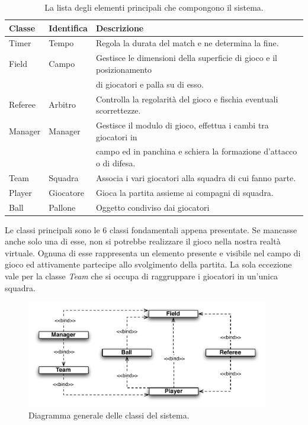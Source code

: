 \documentclass[aps,letterpaper,10pt]{article}
\begin{document}
\begin{table}[H]
\begin{center}
	\begin{tabular}{|l|l|l|}
		\hline
		\textbf{Classe} & \textbf{Identifica} & \textbf{Descrizione} \\ \hline \hline
		Timer & Tempo & Regola la durata del match e ne determina la fine. \\ \hline
		Field & Campo & Gestisce le dimensioni della superficie di gioco e il posizionamento \\
		& & di giocatori e palla su di esso. \\ \hline
		Referee & Arbitro & Controlla la regolarit\`a del gioco e fischia eventuali scorrettezze. \\ \hline
		Manager & Manager & Gestisce il modulo di gioco, effettua i cambi tra giocatori in \\
		& & campo ed in panchina e schiera la formazione d'attacco o di difesa. \\ \hline
		Team & Squadra & Associa i vari giocatori alla squadra di cui fanno parte. \\ \hline
		Player & Giocatore & Gioca la partita assieme ai compagni di squadra. \\ \hline
		Ball & Pallone & Oggetto condiviso dai giocatori \\ \hline
		\end{tabular}
\end{center}
\caption{La lista degli elementi principali che compongono il sistema.}
\end{table}

Le classi principali sono le 6 classi fondamentali appena presentate. Se mancasse anche solo una di esse, non si potrebbe realizzare il gioco nella nostra realt\`a virtuale. Ognuna di esse rappresenta un elemento presente e visibile nel campo di gioco ed attivamente partecipe allo svolgimento della partita. La sola eccezione vale per la classe \emph{Team} che si occupa di raggruppare i giocatori in un'unica squadra. \vspace{3mm}

\begin{figure}[H]
	\begin{center}
		\includegraphics[width=400px]{images/relations-class-schema.pdf}
	\end{center}
\caption{Diagramma generale delle classi del sistema.}
\end{figure}
\end{document}
